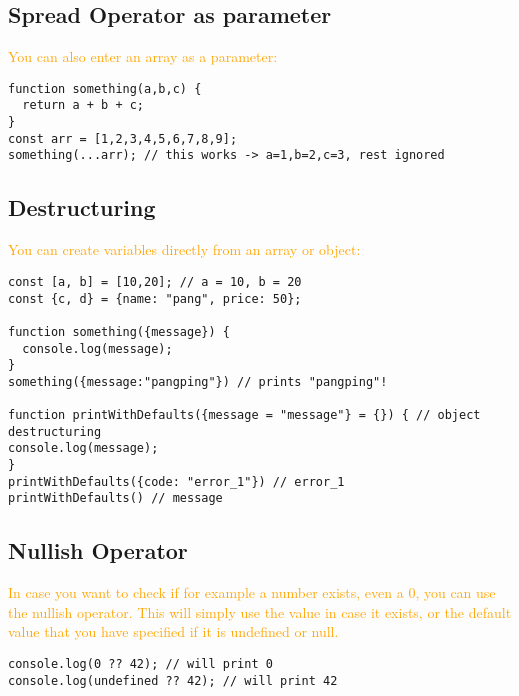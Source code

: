 \documentclass[main.tex,fontsize=6pt,paper=a4,paper=landscape,DIV=calc,]{scrartcl}
\begin{document}
\begin{multicols*}{4}
\subsection{Spread Operator as parameter}  
\textcolor{orange}{You can also enter an array as a parameter:}
\vspace{-2mm}
\begin{lstlisting}
function something(a,b,c) {
  return a + b + c;
}
const arr = [1,2,3,4,5,6,7,8,9];
something(...arr); // this works -> a=1,b=2,c=3, rest ignored
\end{lstlisting}
\vspace{2mm}

\subsection{Destructuring}  
\textcolor{orange}{You can create variables directly from an array or object:}
\vspace{-2mm}
\begin{lstlisting}
const [a, b] = [10,20]; // a = 10, b = 20 
const {c, d} = {name: "pang", price: 50};

function something({message}) {
  console.log(message);
}
something({message:"pangping"}) // prints "pangping"!

function printWithDefaults({message = "message"} = {}) { // object destructuring
console.log(message);
}
printWithDefaults({code: "error_1"}) // error_1
printWithDefaults() // message
\end{lstlisting}
\vspace{2mm}

\subsection{Nullish Operator}  
\textcolor{orange}{In case you want to check if for example a number exists, even a 0, you can use the nullish operator.\newline
This will simply use the value in case it exists, or the default value that you have specified if it is undefined or null.}
\vspace{-2mm}
\begin{lstlisting}
console.log(0 ?? 42); // will print 0 
console.log(undefined ?? 42); // will print 42
\end{lstlisting}
\vspace{2mm}



\end{multicols*}
\end{document}

